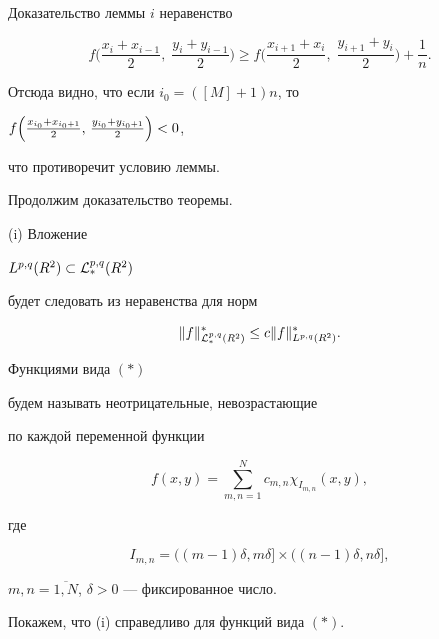 \begin{pf*}{Доказательство леммы}
$i$ неравенство


$$


f \biggl( \frac{x_i+x_{i-1}}{2},\;


\frac{y_i+y_{i-1}}{2} \biggr) \ge


f \biggl( \frac{x_{i+1}+x_i}{2},\;


\frac{y_{i+1}+y_i}{2} \biggr) + \frac{1}{n}.


$$


Отсюда видно, что если $i_0 = ([M]+1)n$, то


$f \Bigl(\frac{x_{i_0}+x_{i_0+1}}{2},\,


\frac{y_{i_0}+y_{i_0+1}}{2} \Bigr) < 0$,


что противоречит условию леммы.


\end{pf*}





Продолжим доказательство теоремы.





(i) Вложение


$L^{p,q}(R^2) \subset {\cal L}_*^{p,q}(R^2)$


будет следовать из неравенства для норм


\begin{equation}


\|f\|_{{\cal L}_*^{p,q}(R^2)}^* \le


c\|f\|_{L^{p,q}(R^2)}^*.


\end{equation}





Функциями вида $(*)$


будем называть неотрицательные, невозрастающие


по каждой переменной функции


$$


f(x,y) = \sum_{m,n=1}^{N} c_{m,n} \chi_{I_{m,n}}(x,y),


$$


где


$$


I_{m,n} = ((m-1)\delta,m\delta] \times ((n-1)\delta,n\delta],


$$


$m,n= \overline{1,N}$, $\delta > 0$ --- фиксированное число.


Покажем, что (i) справедливо для функций вида $(*)$.



